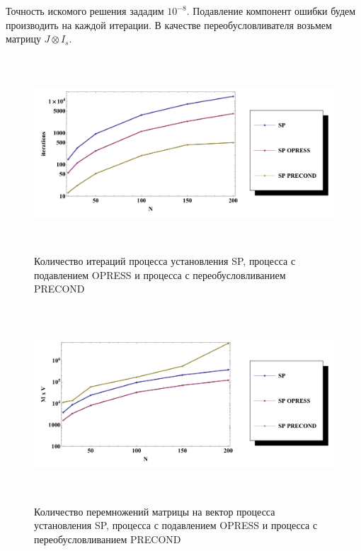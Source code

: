 \documentclass[a4paper,14pt]{extreport}
\begin{document}
Точность искомого решения зададим $10^{-8}$. Подавление компонент ошибки будем производить на каждой итерации. В качестве переобусловливателя возьмем матрицу $J\otimes I_s$.

	 \begin{figure}[H]
	\begin{center}
	\includegraphics[height=7.3cm]{pics/num_ex_2_2_1.pdf}
	\caption{\small Количество итераций процесса установления SP, процесса с подавлением OPRESS и процесса с переобусловливанием PRECOND}
	\label{num_ex_2_2_1}
	\end{center}
	\end{figure}


	\begin{figure}[H]
	\begin{center}
	\includegraphics[height=7.3cm]{pics/num_ex_2_2_2.pdf}
	\caption{\small Количество перемножений матрицы на вектор процесса установления SP, процесса с подавлением OPRESS и процесса с переобусловливанием PRECOND}
	\label{num_ex_2_2_2}
	\end{center}
	\end{figure}
\end{document}
